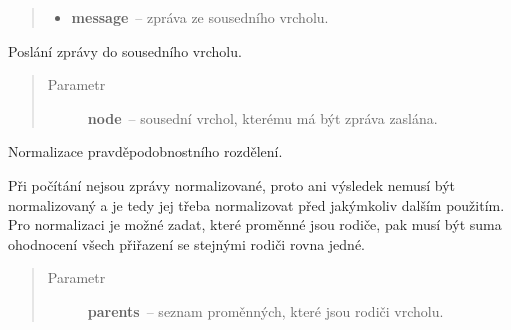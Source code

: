 \begin{fulllineitems}
\begin{fulllineitems}
\begin{quote}
\begin{description}
\begin{itemize}
\item {} 
\textbf{message}~-- zpráva ze sousedního vrcholu.

\end{itemize}

\end{description}\end{quote}

\end{fulllineitems}


\begin{fulllineitems}
\label{alex.infer:alex.infer.factor.alex.infer.node.DiscreteFactorNode.message_to}
Poslání zprávy do sousedního vrcholu.
\begin{quote}\begin{description}
\item[{Parametr}] \leavevmode
\textbf{node}~-- sousední vrchol, kterému má být zpráva zaslána.

\end{description}\end{quote}

\end{fulllineitems}


\begin{fulllineitems}
\label{alex.infer:alex.infer.factor.alex.infer.node.DiscreteFactorNode.normalize}
Normalizace pravděpodobnostního rozdělení.

Při počítání nejsou zprávy normalizované, proto ani výsledek nemusí být
normalizovaný a je tedy jej třeba normalizovat před jakýmkoliv dalším
použitím. Pro normalizaci je možné zadat, které proměnné jsou rodiče,
pak musí být suma ohodnocení všech přiřazení se stejnými rodiči rovna
jedné.
\begin{quote}\begin{description}
\item[{Parametr}] \leavevmode
\textbf{parents}~-- seznam proměnných, které jsou rodiči vrcholu.

\end{description}\end{quote}

\end{fulllineitems}


\end{fulllineitems}
